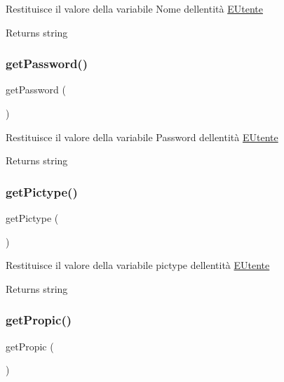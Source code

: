 Restituisce il valore della variabile Nome dell\textquotesingle{}entità \mbox{\hyperlink{class_e_utente}{E\+Utente}}

\begin{DoxyReturn}{Returns}
string 
\end{DoxyReturn}
\mbox{\label{class_e_utente_a04e0957baeb7acde9c0c86556da2d43f}} 
\subsubsection{\texorpdfstring{get\+Password()}{getPassword()}}
{\footnotesize\ttfamily get\+Password (\begin{DoxyParamCaption}{ }\end{DoxyParamCaption})}

Restituisce il valore della variabile Password dell\textquotesingle{}entità \mbox{\hyperlink{class_e_utente}{E\+Utente}}

\begin{DoxyReturn}{Returns}
string 
\end{DoxyReturn}
\mbox{\label{class_e_utente_ad7692598156e778e9c744ed7b32877fd}} 
\subsubsection{\texorpdfstring{get\+Pictype()}{getPictype()}}
{\footnotesize\ttfamily get\+Pictype (\begin{DoxyParamCaption}{ }\end{DoxyParamCaption})}

Restituisce il valore della variabile pictype dell\textquotesingle{}entità \mbox{\hyperlink{class_e_utente}{E\+Utente}}

\begin{DoxyReturn}{Returns}
string 
\end{DoxyReturn}
\mbox{\label{class_e_utente_afb77cb35ab7e2fba8cb983fbbbb8bfd8}} 
\subsubsection{\texorpdfstring{get\+Propic()}{getPropic()}}
{\footnotesize\ttfamily get\+Propic (\begin{DoxyParamCaption}{ }\end{DoxyParamCaption})}

